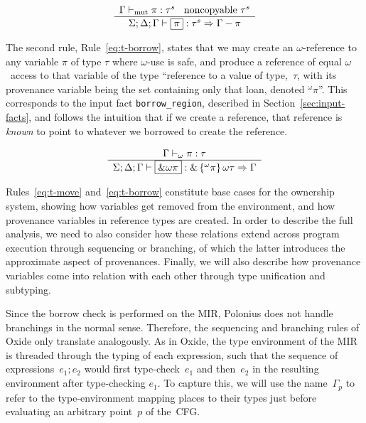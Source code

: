 \documentclass[11pt,a4paper,twoside,openany,draft]{report}
\newcommand{\InDatalog}[1]{\texttt{#1}}
\newcommand{\expression}[1]{\boxed{#1}}
\newcommand{\ntyperule}[2]{\begin{array}{c}#1\\\hline\raisebox{1pt}{\strut}#2\end{array}}
\begin{document}
\begin{equation}\label{eq:t-move}
  \ntyperule{
    \Gamma \vdash_{\text{mut}} \pi : \tau^s \:\:\:\:
    \text{noncopyable } \tau^s}
  {
    \Sigma ; \Delta ; \Gamma \vdash \expression{\pi} : \tau^s \Rightarrow \Gamma - \pi
  }
\end{equation}

The second rule, Rule~\eqref{eq:t-borrow}, states that we may create an
$\omega$-reference to any variable $\pi$ of type $\tau$ where $\omega$-use is
safe, and produce a reference of equal $\omega$~access to that variable of the
type ``reference to a value of type,~$\tau$, with its provenance variable being
the set containing only that loan, denoted $^{\omega}\pi$''. This corresponds to
the input fact \InDatalog{borrow_region}, described in
Section~\ref{sec:input-facts}, and follows the intuition that if we create a
reference, that reference is \emph{known} to point to whatever we borrowed to
create the reference.

\begin{equation}\label{eq:t-borrow}
  \ntyperule{
    \Gamma \vdash_{\omega} \pi : \tau}
  {
    \Sigma ; \Delta ; \Gamma \vdash \expression{\&\omega \pi} : \& \left \{ ^{\omega}\pi\right \} \omega \tau \Rightarrow \Gamma
  }
\end{equation}

Rules~\eqref{eq:t-move} and~\eqref{eq:t-borrow} constitute base cases for the
ownership system, showing how variables get removed from the environment, and
how provenance variables in reference types are created. In order to describe
the full analysis, we need to also consider how these relations extend across
program execution through sequencing or branching, of which the latter
introduces the approximate aspect of provenances. Finally, we will also describe
how provenance variables come into relation with each other through type
unification and subtyping.

Since the borrow check is performed on the MIR, Polonius does not handle
branchings in the normal sense. Therefore, the sequencing and branching rules of
Oxide only translate analogously. As in Oxide, the type environment of the MIR
is threaded through the typing of each expression, such that the sequence of
expressions~$\expression{e_1; e_2}$ would first type-check~$e_1$ and then~$e_2$
in the resulting environment after type-checking $e_1$. To capture this, we will
use the name~$\Gamma_p$ to refer to the type-environment mapping places to their
types just before evaluating an arbitrary point~$p$ of the~CFG.
\end{document}
